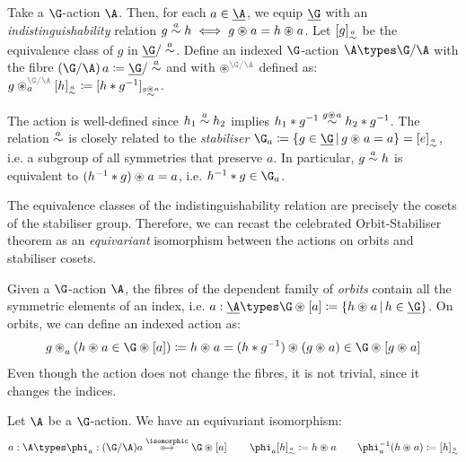 \begin{definition}
  Take a $\G$-action $\A$. Then, for each $a \in \carrier\A$, we equip
  $\carrier\G$ with an \emph{indistinguishability} relation $g \stabeq
  a h \iff g \act a = h \act a$. Let $[g]_{\overset{a}\sim}$ be the
  equivalence class of $g$ in $\carrier\G / \stabeq a$. Define an
  indexed $\G$-action $\A \types \G / \A$ with the fibre $(\G / \A) \, a
  \definedby \carrier\G / \stabeq a$ and with $\act[\G / \A]$ defined
  as:
  $
  g \iact[\G / \A] a{[h]_{\stabeq a}} \definedby [h \mul \inv g]_{\stabeq {g \act a}}
  $.
\end{definition}

The action is well-defined since $h_1 \overset{a}\sim h_2$ implies $h_1 \mul
\inv g \stabeq{g \act a} h_2 \mul \inv g$. The relation $\overset{a}\sim$ is
closely related to the \emph{stabiliser} $\stabilise a \definedby
\set{g \in \carrier\G \suchthat g \act a = a} = [\unit]_{\stabeq a}$, i.e. a subgroup of all
symmetries that preserve $a$. In particular, $g \overset{a}\sim h$ is
equivalent to $(\inv h \mul g) \act a = a$, i.e. $\inv h \mul g \in
\stabilise a$.

\begin{remark}
The equivalence classes of the indistinguishability relation are
precisely the cosets of the stabiliser group. Therefore, we can recast the
celebrated Orbit-Stabiliser theorem as an \emph{equivariant} isomorphism between
the actions on orbits and stabiliser cosets.

Given a $\G$-action $\A$, the fibres of the dependent family of
\emph{orbits} contain all the symmetric elements of an index, i.e. $a
: \carrier\A \types \OrbitOf[\G]a \definedby \set{h \act a \suchthat h
\in \carrier\G}$. On orbits, we can define an indexed action as:
\[
  g \iact a (h \act a \in \OrbitOf a)
  \definedby
  h \act a
  =
  (h \mul \inv g) \act (g \act a)
  \in
  \OrbitOf{g \act a}
\]
Even though the action does not change the fibres, it is not
trivial, since it changes the indices.
\end{remark}

\begin{theorem}
  Let $\A$ be a $\G$-action. We have an equivariant isomorphism:
  \[
  a : \A \types \phi_a : (\G / \A) a \overset{\isomorphic}\equito \OrbitOf{a}
  \qquad
  \phi_a [h]_{\stabeq a} \definedby h \act a
  \qquad
  \inv \phi_a(h \act a) \definedby [h]_{\stabeq a}
  \]
\end{theorem}

